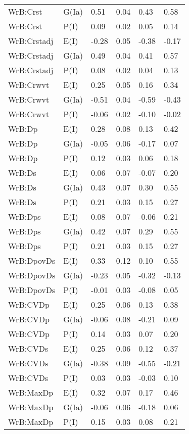\begin{center}
\begin{longtable}{|p{1.1in}|p{0.7in}|p{0.7in}|p{0.6in}|p{0.6in}|p{0.6in}|}
  WrB:Crst & G(Ia) & 0.51 & 0.04 & 0.43 & 0.58 \\ 
  WrB:Crst & P(I) & 0.09 & 0.02 & 0.05 & 0.14 \\ 
  WrB:Crstadj & E(I) & -0.28 & 0.05 & -0.38 & -0.17 \\ 
  WrB:Crstadj & G(Ia) & 0.49 & 0.04 & 0.41 & 0.57 \\ 
  WrB:Crstadj & P(I) & 0.08 & 0.02 & 0.04 & 0.13 \\ 
  WrB:Crwvt & E(I) & 0.25 & 0.05 & 0.16 & 0.34 \\ 
  WrB:Crwvt & G(Ia) & -0.51 & 0.04 & -0.59 & -0.43 \\ 
  WrB:Crwvt & P(I) & -0.06 & 0.02 & -0.10 & -0.02 \\ 
  WrB:Dp & E(I) & 0.28 & 0.08 & 0.13 & 0.42 \\ 
  WrB:Dp & G(Ia) & -0.05 & 0.06 & -0.17 & 0.07 \\ 
  WrB:Dp & P(I) & 0.12 & 0.03 & 0.06 & 0.18 \\ 
  WrB:Ds & E(I) & 0.06 & 0.07 & -0.07 & 0.20 \\ 
  WrB:Ds & G(Ia) & 0.43 & 0.07 & 0.30 & 0.55 \\ 
  WrB:Ds & P(I) & 0.21 & 0.03 & 0.15 & 0.27 \\ 
  WrB:Dps & E(I) & 0.08 & 0.07 & -0.06 & 0.21 \\ 
  WrB:Dps & G(Ia) & 0.42 & 0.07 & 0.29 & 0.55 \\ 
  WrB:Dps & P(I) & 0.21 & 0.03 & 0.15 & 0.27 \\ 
  WrB:DpovDs & E(I) & 0.33 & 0.12 & 0.10 & 0.55 \\ 
  WrB:DpovDs & G(Ia) & -0.23 & 0.05 & -0.32 & -0.13 \\ 
  WrB:DpovDs & P(I) & -0.01 & 0.03 & -0.08 & 0.05 \\ 
  WrB:CVDp & E(I) & 0.25 & 0.06 & 0.13 & 0.38 \\ 
  WrB:CVDp & G(Ia) & -0.06 & 0.08 & -0.21 & 0.09 \\ 
  WrB:CVDp & P(I) & 0.14 & 0.03 & 0.07 & 0.20 \\ 
  WrB:CVDs & E(I) & 0.25 & 0.06 & 0.12 & 0.37 \\ 
  WrB:CVDs & G(Ia) & -0.38 & 0.09 & -0.55 & -0.21 \\ 
  WrB:CVDs & P(I) & 0.03 & 0.03 & -0.03 & 0.10 \\ 
  WrB:MaxDp & E(I) & 0.32 & 0.07 & 0.17 & 0.46 \\ 
  WrB:MaxDp & G(Ia) & -0.06 & 0.06 & -0.18 & 0.06 \\ 
  WrB:MaxDp & P(I) & 0.15 & 0.03 & 0.08 & 0.21 \\ 

\end{longtable}
\end{center}
